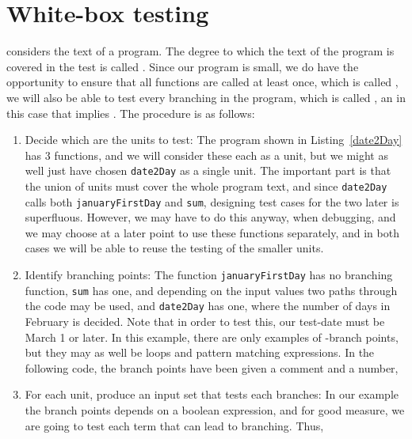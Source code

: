 \section{White-box testing}
 considers the text of a program. The degree to which the text of the program is covered in the test is called . Since our program is small, we do have the opportunity to ensure that all functions are called at least once, which is called , we will also be able to test every branching in the program, which is called , an in this case that implies . The procedure is as follows:
\begin{enumerate}
\item Decide which are the units to test: The program shown in Listing~\ref{date2Day} has 3 functions, and we will consider these each as a unit, but we might as well just have chosen \lstinline!date2Day! as a single unit. The important part is that the union of units must cover the whole program text, and since \lstinline!date2Day! calls both \lstinline!januaryFirstDay! and \lstinline!sum!, designing test cases for the two later is superfluous. However, we may have to do this anyway, when debugging, and we may choose at a later point to use these functions separately, and in both cases we will be able to reuse the testing of the smaller units.
\item Identify branching points: The function \lstinline!januaryFirstDay! has no branching function, \lstinline!sum! has one, and depending on the input values two paths through the code may be used, and \lstinline!date2Day! has one, where the number of days in February is decided. Note that in order to test this, our test-date must be March 1 or later. In this example, there are only examples of -branch points, but they may as well be loops and pattern matching expressions. In the following code, the branch points have been given a comment and a number,
 \item For each unit, produce an input set that tests each branches: In our example the branch points depends on a boolean expression, and for good measure, we are going to test each term that can lead to branching. Thus,
   \begin{center}
     \begin{tabularx}{\linewidth}{|l|l|l|l|X|}

\end{tabularx}
\end{center}
\end{enumerate}
